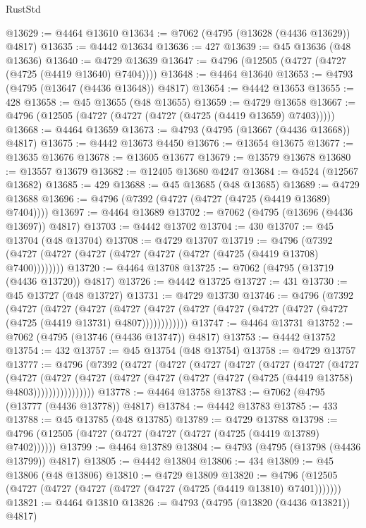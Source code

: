 \begin{lexlean}{RustStd}
\begin{coremodule}
@13629 := @4464 @13610
@13634 := @7062 (@4795 (@13628 (@4436 @13629)) @4817)
@13635 := @4442 @13634
@13636 := 427
@13639 := @45 @13636 (@48 @13636)
@13640 := @4729 @13639
@13647 := @4796 (@12505 (@4727 (@4727 (@4725 (@4419 @13640) @7404))))
@13648 := @4464 @13640
@13653 := @4793 (@4795 (@13647 (@4436 @13648)) @4817)
@13654 := @4442 @13653
@13655 := 428
@13658 := @45 @13655 (@48 @13655)
@13659 := @4729 @13658
@13667 := @4796 (@12505 (@4727 (@4727 (@4727 (@4725 (@4419 @13659) @7403)))))
@13668 := @4464 @13659
@13673 := @4793 (@4795 (@13667 (@4436 @13668)) @4817)
@13675 := @4442 @13673 @4450
@13676 := @13654 @13675
@13677 := @13635 @13676
@13678 := @13605 @13677
@13679 := @13579 @13678
@13680 := @13557 @13679
@13682 := @12405 @13680 @4247
@13684 := @4524 (@12567 @13682)
@13685 := 429
@13688 := @45 @13685 (@48 @13685)
@13689 := @4729 @13688
@13696 := @4796 (@7392 (@4727 (@4727 (@4725 (@4419 @13689) @7404))))
@13697 := @4464 @13689
@13702 := @7062 (@4795 (@13696 (@4436 @13697)) @4817)
@13703 := @4442 @13702
@13704 := 430
@13707 := @45 @13704 (@48 @13704)
@13708 := @4729 @13707
@13719 := @4796 (@7392 (@4727 (@4727 (@4727 (@4727 (@4727 (@4727 (@4725 (@4419 @13708) @7400))))))))
@13720 := @4464 @13708
@13725 := @7062 (@4795 (@13719 (@4436 @13720)) @4817)
@13726 := @4442 @13725
@13727 := 431
@13730 := @45 @13727 (@48 @13727)
@13731 := @4729 @13730
@13746 := @4796
    (@7392
      (@4727
        (@4727
          (@4727
            (@4727 (@4727 (@4727 (@4727 (@4727 (@4727 (@4727 (@4725 (@4419 @13731) @4807))))))))))))
@13747 := @4464 @13731
@13752 := @7062 (@4795 (@13746 (@4436 @13747)) @4817)
@13753 := @4442 @13752
@13754 := 432
@13757 := @45 @13754 (@48 @13754)
@13758 := @4729 @13757
@13777 := @4796
    (@7392
      (@4727
        (@4727
          (@4727
            (@4727
              (@4727
                (@4727
                  (@4727
                    (@4727
                      (@4727
                        (@4727
                          (@4727 (@4727 (@4727 (@4727 (@4725 (@4419 @13758) @4803))))))))))))))))
@13778 := @4464 @13758
@13783 := @7062 (@4795 (@13777 (@4436 @13778)) @4817)
@13784 := @4442 @13783
@13785 := 433
@13788 := @45 @13785 (@48 @13785)
@13789 := @4729 @13788
@13798 := @4796 (@12505 (@4727 (@4727 (@4727 (@4727 (@4725 (@4419 @13789) @7402))))))
@13799 := @4464 @13789
@13804 := @4793 (@4795 (@13798 (@4436 @13799)) @4817)
@13805 := @4442 @13804
@13806 := 434
@13809 := @45 @13806 (@48 @13806)
@13810 := @4729 @13809
@13820 := @4796 (@12505 (@4727 (@4727 (@4727 (@4727 (@4727 (@4725 (@4419 @13810) @7401)))))))
@13821 := @4464 @13810
@13826 := @4793 (@4795 (@13820 (@4436 @13821)) @4817)

\end{coremodule}
\end{lexlean}
